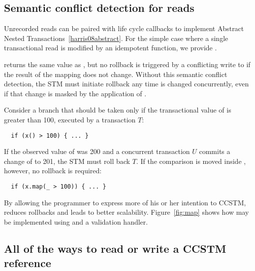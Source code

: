 \subsection{Semantic conflict detection for reads}
\label{sec:map}

Unrecorded reads can be paired with life cycle callbacks to implement
Abstract Nested Transactions~\ref{harris08abstract}.  For the simple case where
a single transactional read is modified by an idempotent function, we provide
\code{map[}\code{](f: }\code{ => }\code{): }.

 returns the same value as , but no rollback
is triggered by a conflicting write to  if the result of the mapping
does not change.  Without this
semantic conflict detection, the STM must initiate rollback any time 
is changed concurrently, even if that change is masked by the application of
.

Consider a branch that should be taken only if the transactional value of
 is greater than 100, executed by a transaction $T$:
\lstset{numbers=none}
\begin{lstlisting}
  if (x() > 100) { ... }
\end{lstlisting}
\lstset{numbers=left}
If the observed value of  was 200 and a concurrent transaction $U$ commits
a change of  to 201, the STM must roll back $T$.  If the comparison is
moved inside , however, no rollback is required:
\lstset{numbers=none}
\begin{lstlisting}
  if (x.map(_ > 100)) { ... }
\end{lstlisting}
\lstset{numbers=left}
By allowing the programmer to express more of his or her intention to CCSTM,
 reduces rollbacks and leads to better scalability.
Figure~\ref{fig:map} shows how  may be implemented using
 and a validation handler.



\subsection{All of the ways to read or write a CCSTM reference}

